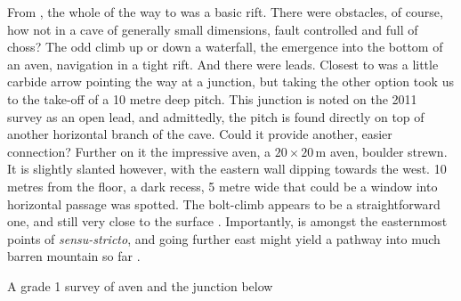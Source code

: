 From , the whole of the way to  was a basic rift. There were obstacles, of course, how not in a cave of generally small dimensions, fault controlled and full of choss? The odd climb up or down a waterfall, the emergence into the bottom of an aven, navigation in a tight rift. And there were leads. Closest to  was a little carbide arrow pointing the way at a junction, but taking the other option took us to the take-off of a 10 metre deep pitch. This junction is noted on the 2011 survey as an open lead, and admittedly, the pitch is found directly on top of another horizontal branch of the cave. Could it provide another, easier connection? Further on it the impressive  aven, a $20\times20$\,m aven, boulder strewn. It is slightly slanted however, with the eastern wall dipping towards the west. 10 metres from the floor, a dark recess, 5 metre wide  that could be a window into horizontal passage was spotted. The bolt-climb appears to be a straightforward one, and still very close to the surface . Importantly,  is amongst the easternmost points of  \emph{sensu-stricto}, and going further east might yield a pathway into much barren mountain so far .

\begin{survey*}[t]
\checkoddpage \ifoddpage \forcerectofloat \else \forceversofloat \fi
\centering
{}
\caption[Povezava branch (grade 1)]{A grade 1 survey of \protect{} aven and the \protect{} junction below }
\label{Grade 1 survey}
\end{survey*}

